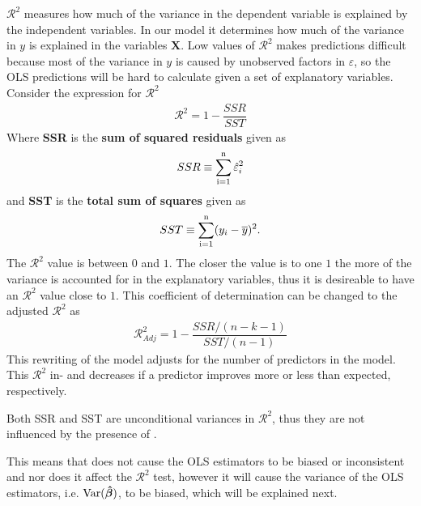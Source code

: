 $\mathcal{R}^2$ measures how much of the variance in the dependent variable is explained by the independent variables. In our model it determines how much of the variance in $y$ is explained in the variables $\mathbf{X}$. 
Low values of $\mathcal{R}^2$ makes predictions difficult because most of the variance in $y$ is caused by unobserved factors in $\varepsilon$, so the OLS predictions will be hard to calculate given a set of explanatory variables.
Consider the expression for $\mathcal{R}^2$
\begin{align*}
    \mathcal{R}^2 = 1 - \dfrac{SSR}{SST}
\end{align*}
Where \textbf{SSR} is the \textbf{sum of squared residuals} given as
\begin{align*}
    SSR \equiv \operatorname{\sum_{i=1}^n} \hat{\varepsilon}_i^2
\end{align*}
and \textbf{SST} is the \textbf{total sum of squares} given as
\begin{align*}
    SST \equiv \operatorname{\sum_{i=1}^n} (y_i - \overline{y})^2. 
\end{align*}
The $\mathcal{R}^2$ value is between $0$ and $1$. The closer the value is to one $1$ the more of the variance is accounted for in the explanatory variables, thus it is desireable to have an $\mathcal{R}^2$ value close to $1$.
This coefficient of determination can be changed to the adjusted $\mathcal{R}^2$ as
\begin{align*}
    \mathcal{R}^2_{Adj} = 1 - \dfrac{SSR/(n - k - 1)}{SST/(n - 1)}
\end{align*}
This rewriting of the model adjusts for the number of predictors in the model. This $\mathcal{R}^2$ in- and decreases if a predictor improves more or less than expected, respectively. 

Both SSR and SST are unconditional variances in $\mathcal{R}^2$, thus they are not influenced by the presence of \hetero.  

This means that \hetero does not cause the OLS estimators to be biased or inconsistent and nor does it affect the $\mathcal{R}^2$ test, however it will cause the variance of the OLS estimators, i.e. $\operatorname{\text{Var}}(\operatorname{\boldsymbol{\hat{\beta}}})$, to be biased, which will be explained next.  

